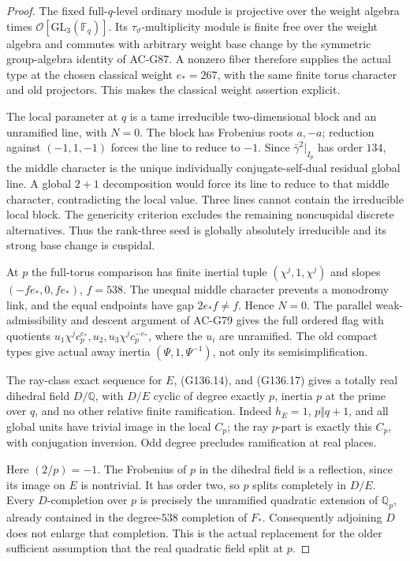 \begin{proof}
The fixed full-\(q\)-level ordinary module is projective over
the weight algebra times \(\mathcal O[\mathrm{GL}_3(\mathbb F_q)]\).
Its \(\tau_\vartheta\)-multiplicity module is finite free over
the weight algebra and commutes with arbitrary weight base
change by the symmetric group-algebra identity of AC-G87.
A nonzero fiber therefore supplies the actual type at the
chosen classical weight \(e_*=267\), with the same finite
torus character and old projectors.  This makes the classical
weight assertion explicit.

The local parameter at \(q\) is a tame irreducible two-dimensional
block and an unramified line, with \(N=0\).
The block has Frobenius roots \(a,-a\); reduction against
\((-1,1,-1)\) forces the line to reduce to \(-1\).
Since \(\bar\gamma^2|_{I_p}\) has order \(134\), the middle
character is the unique individually conjugate-self-dual
residual global line.  A global \(2+1\) decomposition would
force its line to reduce to that middle character, contradicting
the local value.  Three lines cannot contain the irreducible
local block.  The genericity criterion excludes the remaining
noncuspidal discrete alternatives.  Thus the rank-three seed
is globally absolutely irreducible and its strong base change
is cuspidal.

At \(p\) the full-torus comparison has finite inertial tuple
\((\chi^j,1,\chi^j)\) and slopes \((-fe_*,0,fe_*)\),
\(f=538\).  The unequal middle character prevents a monodromy
link, and the equal endpoints have gap \(2e_*f\ne f\).
Hence \(N=0\).  The parallel weak-admissibility and descent
argument of AC-G79 gives the full ordered flag with quotients
\(u_1\chi^jc_p^{e_*},u_2,u_3\chi^jc_p^{-e_*}\), where
the \(u_i\) are unramified.  The old compact types give
actual away inertia \((\Psi,1,\Psi^{-1})\), not only its
semisimplification.

The ray-class exact sequence for \(E\), (G136.14), and
(G136.17) gives a totally real dihedral field \(D/\mathbb Q\),
with \(D/E\) cyclic of degree exactly \(p\), inertia \(p\)
at the prime over \(q\), and no other relative finite
ramification.  Indeed \(h_E=1\), \(p\Vert q+1\), and all
global units have trivial image in the local \(C_p\); the ray
\(p\)-part is exactly this \(C_p\), with conjugation inversion.
Odd degree precludes ramification at real places.

Here \((2/p)=-1\).  The Frobenius of \(p\) in the dihedral
field is a reflection, since its image on \(E\) is nontrivial.
It has order two, so \(p\) splits completely in \(D/E\).
Every \(D\)-completion over \(p\) is precisely the unramified
quadratic extension of \(\mathbb Q_p\), already contained in
the degree-\(538\) completion of \(F_*\).
Consequently adjoining \(D\) does not enlarge that completion.
This is the actual replacement for the older sufficient
assumption that the real quadratic field split at \(p\).


\end{proof}
